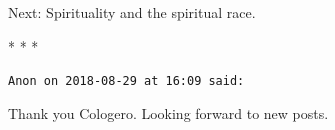 Next: Spirituality and the spiritual race.



\begin{center}* * *\end{center}

\begin{footnotesize}
\begin{sffamily}
\texttt{Anon on 2018-08-29 at 16:09 said:}

Thank you Cologero. Looking forward to new posts.


\hfill

\end{sffamily}
\end{footnotesize}

